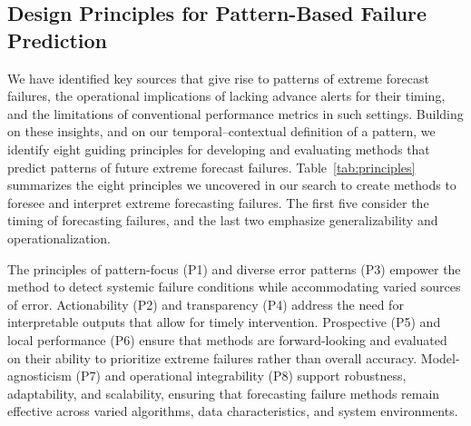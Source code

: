 \documentclass[]{interact}
\theoremstyle{plain}
\theoremstyle{definition}
\theoremstyle{remark}
\begin{document}
\subsection{Design Principles for Pattern-Based Failure Prediction}
\label{subsec-principles}

We have identified key sources that give rise to patterns of extreme forecast failures, the
operational implications of lacking advance alerts for their timing, and the limitations of
conventional performance metrics in such settings. Building on these insights, and on our
temporal--contextual definition of a pattern, we identify eight guiding principles for
developing and evaluating methods that predict patterns of future extreme forecast failures.
Table~\ref{tab:principles} summarizes the eight principles we uncovered in our search to
create methods to foresee and interpret extreme forecasting failures. The first five consider
the timing of forecasting failures, and the last two emphasize generalizability and
operationalization.

The principles of pattern-focus (P1) and diverse error patterns (P3) empower the method to
detect systemic failure conditions while accommodating varied sources of error. Actionability
(P2) and transparency (P4) address the need for interpretable outputs that allow for timely
intervention. Prospective (P5) and local performance (P6) ensure that methods are
forward-looking and evaluated on their ability to prioritize extreme failures rather than
overall accuracy. Model-agnosticism (P7) and operational integrability (P8) support
robustness, adaptability, and scalability, ensuring that forecasting failure methods remain
effective across varied algorithms, data characteristics, and system environments.
\end{document}

